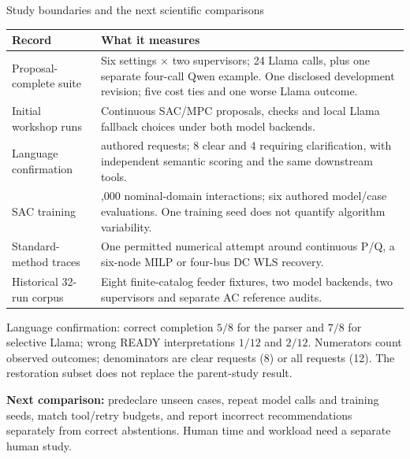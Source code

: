 \begin{frame}[t]{Study boundaries and the next scientific comparisons}
\begin{tabular}{@{}>{\raggedright\arraybackslash}p{.27\linewidth}>{\raggedright\arraybackslash}p{.66\linewidth}@{}}
\toprule Record & What it measures \\
\midrule
Proposal-complete suite & Six settings $\times$ two supervisors; 24 Llama calls, plus one separate four-call Qwen example. One disclosed development revision; five cost ties and one worse Llama outcome. \\
Initial workshop runs & Continuous SAC/MPC proposals, checks and local Llama fallback choices under both model backends. \\
Language confirmation & 12 authored requests; 8 clear and 4 requiring clarification, with independent semantic scoring and the same downstream tools. \\
SAC training & 12,000 nominal-domain interactions; six authored model/case evaluations. One training seed does not quantify algorithm variability. \\
Standard-method traces & One permitted numerical attempt around continuous P/Q, a six-node MILP or four-bus DC WLS recovery. \\
Historical 32-run corpus & Eight finite-catalog feeder fixtures, two model backends, two supervisors and separate AC reference audits. \\
\bottomrule
\end{tabular}
\par\smallskip{} Language confirmation: correct completion $5/8$ for the parser and $7/8$ for selective Llama; wrong READY interpretations $1/12$ and $2/12$. Numerators count observed outcomes; denominators are clear requests (8) or all requests (12). The restoration subset does not replace the parent-study result.
\par\smallskip{}\textbf{Next comparison:} predeclare unseen cases, repeat model calls and training seeds, match tool/retry budgets, and report incorrect recommendations separately from correct abstentions. Human time and workload need a separate human study.
\end{frame}
